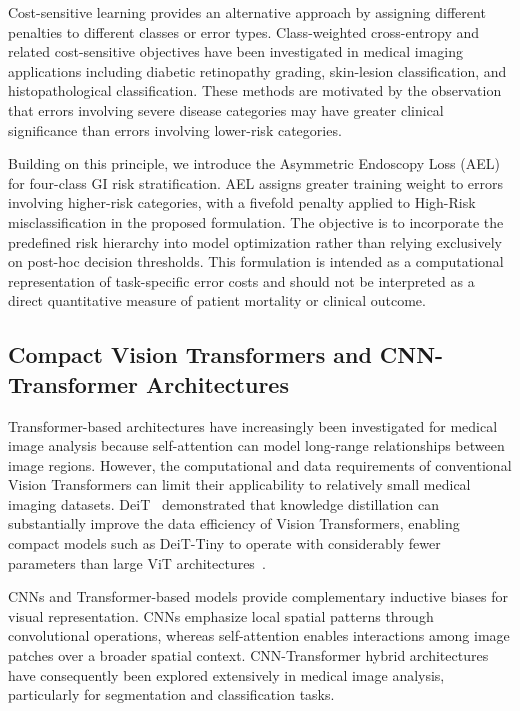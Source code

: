 \documentclass[11pt,a4paper]{article}
\begin{document}
Cost-sensitive learning provides an alternative approach by assigning
different penalties to different classes or error types. Class-weighted
cross-entropy and related cost-sensitive objectives have been investigated in
medical imaging applications including diabetic retinopathy grading,
skin-lesion classification, and histopathological classification. These
methods are motivated by the observation that errors involving severe disease
categories may have greater clinical significance than errors involving
lower-risk categories.

Building on this principle, we introduce the Asymmetric Endoscopy Loss (AEL)
for four-class GI risk stratification. AEL assigns greater training weight to
errors involving higher-risk categories, with a fivefold penalty applied to
High-Risk misclassification in the proposed formulation. The objective is to
incorporate the predefined risk hierarchy into model optimization rather than
relying exclusively on post-hoc decision thresholds. This formulation is
intended as a computational representation of task-specific error costs and
should not be interpreted as a direct quantitative measure of patient
mortality or clinical outcome.

\subsection{Compact Vision Transformers and CNN-Transformer Architectures}
Transformer-based architectures have increasingly been investigated for
medical image analysis because self-attention can model long-range
relationships between image regions. However, the computational and data
requirements of conventional Vision Transformers can limit their applicability
to relatively small medical imaging datasets. DeiT~\citep{Touvron2021}
demonstrated that knowledge distillation can substantially improve the data
efficiency of Vision Transformers, enabling compact models such as DeiT-Tiny
to operate with considerably fewer parameters than large ViT
architectures~\citep{Dosovitskiy2021}.

CNNs and Transformer-based models provide complementary inductive biases for
visual representation. CNNs emphasize local spatial patterns through
convolutional operations, whereas self-attention enables interactions among
image patches over a broader spatial context. CNN-Transformer hybrid
architectures have consequently been explored extensively in medical image
analysis, particularly for segmentation and classification tasks.
\end{document}
